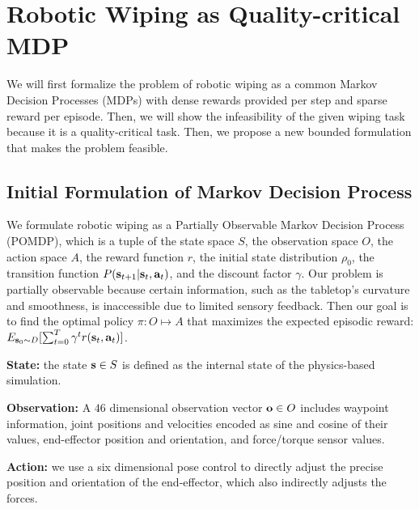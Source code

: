 \section{Robotic Wiping as Quality-critical MDP}
We will first formalize the problem of robotic wiping as a common Markov Decision Processes (MDPs) with dense rewards provided per step and sparse reward per episode. Then, we will show the infeasibility of the given wiping task because it is a quality-critical task. Then, we propose a new bounded formulation that makes the problem feasible.


\subsection{Initial Formulation of Markov Decision Process}
We formulate robotic wiping as a Partially Observable Markov Decision Process (POMDP), which is a tuple of the state space $S$, the observation space $O$, the action space $A$, the reward function $r$, the initial state distribution $\rho_0$, the transition function $P(\mathbf{s}_{t+1} | \mathbf{s}_{t}, \mathbf{a}_{t})$, and the discount factor $\gamma$. Our problem is partially observable because certain information, such as the tabletop's curvature and smoothness, is inaccessible due to limited sensory feedback. Then our goal is to find the optimal policy $\pi: {O} \mapsto {A}$ that maximizes the expected episodic reward: $E_{\mathbf{s}_0 \sim D}[\sum_{t=0}^T \gamma^t r(\mathbf{s}_{t}, \mathbf{a}_{t})]$.

\textbf{State:} the state $\mathbf{s} \in S$ is defined as the internal state of the physics-based simulation.

\textbf{Observation:} A $46$ dimensional observation vector $\mathbf{o} \in O $ includes waypoint information, joint positions and velocities encoded as sine and cosine of their values, end-effector position and orientation, and force/torque sensor values. 



\textbf{Action:} we use a six dimensional pose control to directly adjust the precise position and orientation of the end-effector, which also indirectly adjusts the forces. 


